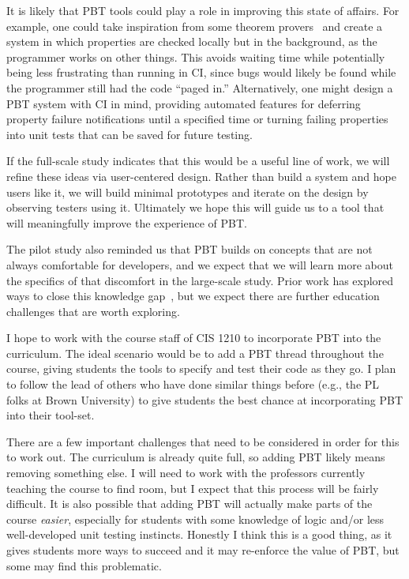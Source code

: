 It is likely that PBT tools could play a role in improving this state of
affairs. For example, one could take inspiration from some theorem
provers~\cite{berghofer2004random} and create a system in which properties are
checked locally but in the background, as the programmer works on other things.
This avoids waiting time while potentially being less frustrating than running
in CI, since bugs would likely be found while the programmer still had the code
``paged in.'' Alternatively, one might design a PBT system with CI in mind,
providing automated features for deferring property failure notifications until
a specified time or turning failing properties into unit tests that can be saved
for future testing.

If the full-scale study indicates that this would be a useful line of work, we
will refine these ideas via user-centered design. Rather than build a system and
hope users like it, we will build minimal prototypes and iterate on the design
by observing testers using it. Ultimately we hope this will guide us to a tool
that will meaningfully improve the experience of PBT.

\label{sec:ed}

The pilot study also reminded us that PBT builds on concepts that are not
always comfortable for developers, and we expect that we will learn more about
the specifics of that discomfort in the large-scale study.  Prior work has
explored ways to close this knowledge
gap~\cite{wrenn2021using,nelson2021automated}, but we expect there are further
education challenges that are worth exploring.

I hope to work with the course staff of CIS 1210 to incorporate PBT into the
curriculum. The ideal scenario would be to add a PBT thread throughout the
course, giving students the tools to specify and test their code as they go.  I
plan to follow the lead of others who have done similar things before (e.g., the
PL folks at Brown University) to give students the best chance at incorporating
PBT into their tool-set.

There are a few important challenges that need to be considered in order for
this to work out.  The curriculum is already quite full, so adding PBT likely
means removing something else. I will need to work with the professors currently
teaching the course to find room, but I expect that this process will be fairly
difficult. It is also possible that adding PBT will actually make parts of the
course {\em easier}, especially for students with some knowledge of logic and/or
less well-developed unit testing instincts. Honestly I think this is a good
thing, as it gives students more ways to succeed and it may re-enforce the value
of PBT, but some may find this problematic.

